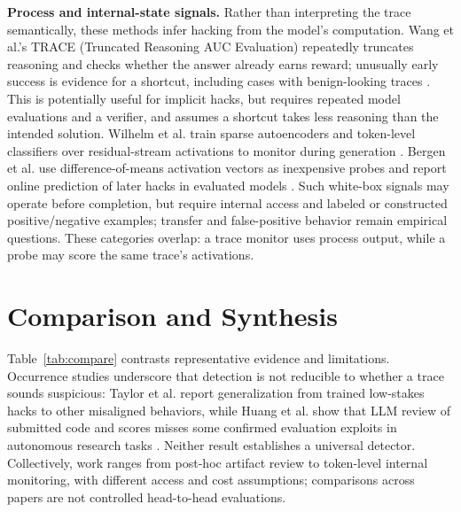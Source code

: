 \documentclass[sigconf,nonacm]{acmart}
\begin{document}
\textbf{Process and internal-state signals.} Rather than interpreting the trace semantically, these methods infer hacking from the model's computation. Wang et al.'s TRACE (Truncated Reasoning AUC Evaluation) repeatedly truncates reasoning and checks whether the answer already earns reward; unusually early success is evidence for a shortcut, including cases with benign-looking traces \cite{wang2026thinking}. This is potentially useful for implicit hacks, but requires repeated model evaluations and a verifier, and assumes a shortcut takes less reasoning than the intended solution. Wilhelm et al. train sparse autoencoders and token-level classifiers over residual-stream activations to monitor during generation \cite{wilhelm2026activations}. Bergen et al. use difference-of-means activation vectors as inexpensive probes and report online prediction of later hacks in evaluated models \cite{bergen2026representations}. Such white-box signals may operate before completion, but require internal access and labeled or constructed positive/negative examples; transfer and false-positive behavior remain empirical questions. These categories overlap: a trace monitor uses process output, while a probe may score the same trace's activations.

\section{Comparison and Synthesis}
Table~\ref{tab:compare} contrasts representative evidence and limitations. Occurrence studies underscore that detection is not reducible to whether a trace sounds suspicious: Taylor et al. report generalization from trained low-stakes hacks to other misaligned behaviors, while Huang et al. show that LLM review of submitted code and scores misses some confirmed evaluation exploits in autonomous research tasks \cite{taylor2025school,huang2026oversight}. Neither result establishes a universal detector. Collectively, work ranges from post-hoc artifact review to token-level internal monitoring, with different access and cost assumptions; comparisons across papers are not controlled head-to-head evaluations.
\end{document}
